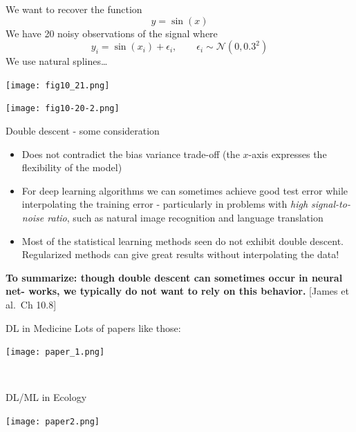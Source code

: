 \documentclass[
  10pt,
  ignorenonframetext,
  twocolumn]{beamer}
\begin{document}
\begin{frame}
We want to recover the function \[
y = \sin(x)
\] We have 20 noisy observations of the signal where \[
y_i = \sin(x_i) +\epsilon_i, \qquad \epsilon_i\sim\mathcal{N}(0,0.3^2)
\] We use natural splines\ldots{}
\end{frame}

\begin{frame}
\texttt{[image: fig10\_21.png]}
\end{frame}

\begin{frame}
\texttt{[image: fig10-20-2.png]}
\end{frame}

\begin{frame}{Double descent - some consideration}
\label{double-descent---some-consideration}
\begin{itemize}
\item
  Does not contradict the bias variance trade-off (the \(x\)-axis
  expresses the flexibility of the model)
\item
  For deep learning algorithms we can sometimes achieve good test error
  while interpolating the training error - particularly in problems with
  \emph{high signal-to-noise ratio}, such as natural image recognition
  and language translation
\item
  Most of the statistical learning methods seen do not exhibit double
  descent. Regularized methods can give great results without
  interpolating the data!
\end{itemize}

\textbf{To summarize: though double descent can sometimes occur in
neural net- works, we typically do not want to rely on this behavior.}
{[}James et al.~Ch 10.8{]}
\end{frame}

\begin{frame}{DL in Medicine}
\label{dl-in-medicine}
Lots of papers like those:

\texttt{[image: paper\_1.png]}

\(~\)
\end{frame}

\begin{frame}{DL/ML in Ecology}
\label{dlml-in-ecology}
\(~\)

\texttt{[image: paper2.png]}
\end{frame}
\end{document}
